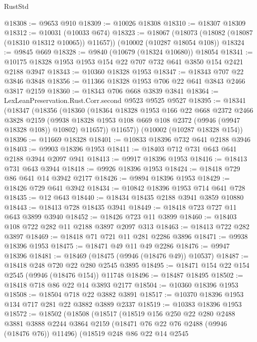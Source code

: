\begin{lexlean}{RustStd}
\begin{coremodule}
@18308 := @9653 @910
@18309 := @10026 @18308
@18310 := @18307 @18309
@18312 := @10031 (@10033 @674)
@18323 := @18067
    (@18073 (@18082 (@18087 (@18310 @18312 @10065)) @11657))
    (@10002 (@10287 @18054 @108))
@18324 := @9845 @669
@18328 := @9840 (@10679 (@18324 @10680)) @18054
@18341 := @10175 @18328 @1953 @1953 @154 @22 @707 @732 @641 @3850 @154 @2421 @2188 @3947
@18343 := @10360 @18328 @1953
@18347 := @18343 @707 @22 @3846 @3848
@18356 := @11366 @18328 @1953 @706 @22 @641 @3843 @2466 @3817 @2159
@18360 := @18343 @706 @668 @3839 @3841
@18364 := LexLeanPreservation.Rust.Corr.second @9523 @9525 @9527
@18395 := @18341
    (@18347
      (@18356
        (@18360
          (@18364
            @18328
            @1953
            @166
            @22
            @668
            @2372
            @2466
            @3828
            @2159
            (@9938 @18328 @1953 @108 @669 @108 @2372 (@9946 (@9947 @18328 @108)) @10802)
            @11657))
        @11657))
    (@10002 (@10287 @18328 @154))
@18396 := @11669 @18328
@18401 := @10833 @18396 @732 @641 @2188 @3946
@18403 := @9903 @18396 @1953
@18411 := @18403 @712 @731 @643 @641 @2188 @3944 @2097 @941
@18413 := @9917 @18396 @1953
@18416 := @18413 @731 @643 @3944
@18418 := @9926 @18396 @1953
@18424 := @18418 @729 @86 @641 @14 @3942 @2177
@18426 := @9894 @18396 @1953
@18429 := @18426 @729 @641 @3942
@18434 := @10842 @18396 @1953 @714 @641 @728
@18435 := @12 @643
@18440 := @18434 @18435 @2188 @3941 @3859 @10880
@18443 := @18413 @728 @18435 @3941
@18449 := @18418 @723 @727 @11 @643 @3899 @3940
@18452 := @18426 @723 @11 @3899
@18460 := @18403 @108 @722 @282 @11 @2188 @3897 @2097 @313
@18463 := @18413 @722 @282 @3897
@18469 := @18418 @71 @721 @11 @281 @2286 @3896
@18471 := @9938 @18396 @1953
@18475 := @18471 @49 @11 @49 @2286
@18476 := @9947 @18396
@18481 := @18469 (@18475 (@9946 (@18476 @49)) @10537)
@18487 := @18418 @248 @720 @22 @280 @2545 @3895
@18495 := @18471 @154 @22 @154 @2545 (@9946 (@18476 @154)) @11748
@18496 := @18487 @18495
@18502 := @18418 @718 @86 @22 @14 @3893 @2177
@18504 := @10360 @18396 @1953
@18508 := @18504 @718 @22 @3882 @3891
@18517 := @10370 @18396 @1953 @134 @717 @281 @22 @3882 @3889 @2337
@18519 := @10383 @18396 @1953
@18572 := @18502
    (@18508
      (@18517
        (@18519
          @156
          @250
          @22
          @280
          @2488
          @3881
          @3888
          @2244
          @3864
          @2159
          (@18471 @76 @22 @76 @2488 (@9946 (@18476 @76)) @11496)
          (@18519
            @248
            @86
            @22
            @14
            @2545

\end{coremodule}
\end{lexlean}
